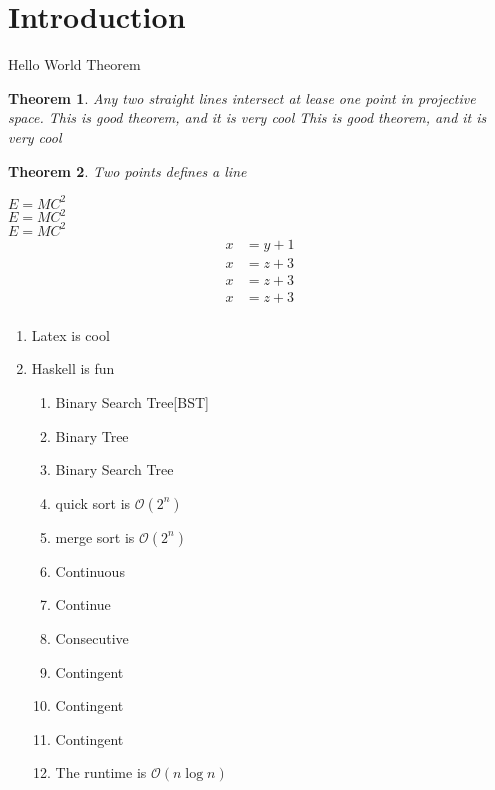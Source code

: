 \documentclass{article}
\newtheorem{theorem}{Theorem}
\begin{document}
\section{Introduction}
Hello World Theorem
\begin{theorem}
Any two straight lines intersect at lease one point in projective space.
This is good theorem, and it is very cool
This is good theorem, and it is very cool
\end{theorem}

\begin{theorem}
Two points defines a line
\end{theorem}

$E = MC^2$ \\
$E = MC^2$ \\
$E = MC^2$ \\

\begin{equation}
\begin{aligned}
x & = y + 1 \\
x & = z + 3 \\
x & = z + 3 \\
x & = z + 3 \\
\end{aligned}
\end{equation} 

\begin{enumerate}
\item Latex is cool
\item Haskell is fun
\begin{enumerate}
\item Binary Search Tree[BST]
\item Binary Tree
\item Binary Search Tree
\item quick sort is $\mathcal{O}(2^n)$  
\item merge sort is $\mathcal{O}(2^n)$  
\item Continuous
\item Continue
\item Consecutive
\item Contingent
\item Contingent
\item Contingent
\item The runtime is $\mathcal{O}(n\log{}n)$ 
\end{enumerate}
\end{enumerate} 
\end{document}
